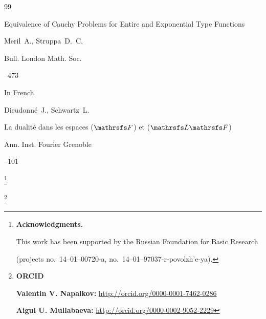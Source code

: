 \begin{thebibliography}{99}

\paper Equivalence of Cauchy Problems for Entire and Exponential Type Functions

\by Meril~A., Struppa~D.~C.

\jour  Bull. London Math. Soc.




--473







\lang In French

\by Dieudonn\'e~J., Schwartz~L.

\paper La dualit\'e dans les espaces ($\mathrsfs F$) et ($\mathrsfs L \mathrsfs F$)



\jour  Ann. Inst. Fourier Grenoble 


--101 






\end{thebibliography}



\RuDate





\newpage





\makeentitle









\thanks{\textbf{Acknowledgments.} 

This work has been supported by the Russian Foundation for Basic Research

 (projects no.~14--01--00720-a, no.~14--01--97037-r-povolzh'e-ya).

}



\thanks{{\bf ORCID}



{\bf Valentin V. Napalkov:} \url{http://orcid.org/0000-0001-7462-0286}



{\bf Aigul U. Mullabaeva:} \url{http://orcid.org/0000-0002-9052-2229}





}





